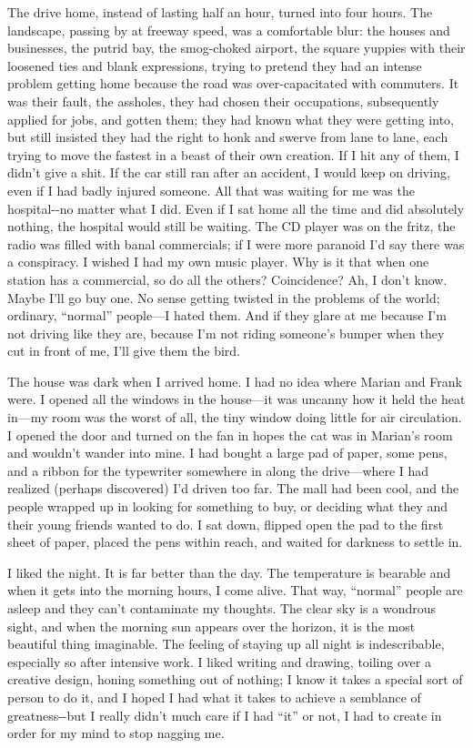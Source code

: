 The drive home, instead of lasting half an hour, turned into four hours.
The landscape, passing by at freeway speed, was a comfortable blur: the
houses and businesses, the putrid bay, the smog-choked airport, the
square yuppies with their loosened ties and blank expressions, trying to
pretend they had an intense problem getting home because the road was
over-capacitated with commuters. It was their fault, the assholes, they
had chosen their occupations, subsequently applied for jobs, and gotten
them; they had known what they were getting into, but still insisted
they had the right to honk and swerve from lane to lane, each trying to
move the fastest in a beast of their own creation. If I hit any of them,
I didn't give a shit. If the car still ran after an accident, I would
keep on driving, even if I had badly injured someone. All that was
waiting for me was the hospital-\/-no matter what I did. Even if I sat
home all the time and did absolutely nothing, the hospital would still
be waiting. The CD player was on the fritz, the radio was filled with
banal commercials; if I were more paranoid I'd say there was a
conspiracy. I wished I had my own music player. Why is it that when one
station has a commercial, so do all the others? Coincidence? Ah, I don't
know. Maybe I'll go buy one. No sense getting twisted in the problems of
the world; ordinary, ``normal'' people---I hated them. And if they glare
at me because I'm not driving like they are, because I'm not riding
someone's bumper when they cut in front of me, I'll give them the bird.

The house was dark when I arrived home. I had no idea where Marian and
Frank were. I opened all the windows in the house---it was uncanny how
it held the heat in---my room was the worst of all, the tiny window
doing little for air circulation. I opened the door and turned on the
fan in hopes the cat was in Marian's room and wouldn't wander into mine.
I had bought a large pad of paper, some pens, and a ribbon for the
typewriter somewhere in along the drive---where I had realized (perhaps
discovered) I'd driven too far. The mall had been cool, and the people
wrapped up in looking for something to buy, or deciding what they and
their young friends wanted to do. I sat down, flipped open the pad to
the first sheet of paper, placed the pens within reach, and waited for
darkness to settle in.

I liked the night. It is far better than the day. The temperature is
bearable and when it gets into the morning hours, I come alive. That
way, ``normal'' people are asleep and they can't contaminate my
thoughts. The clear sky is a wondrous sight, and when the morning sun
appears over the horizon, it is the most beautiful thing imaginable. The
feeling of staying up all night is indescribable, especially so after
intensive work. I liked writing and drawing, toiling over a creative
design, honing something out of nothing; I know it takes a special sort
of person to do it, and I hoped I had what it takes to achieve a
semblance of greatness-\/-but I really didn't much care if I had ``it''
or not, I had to create in order for my mind to stop nagging me.

